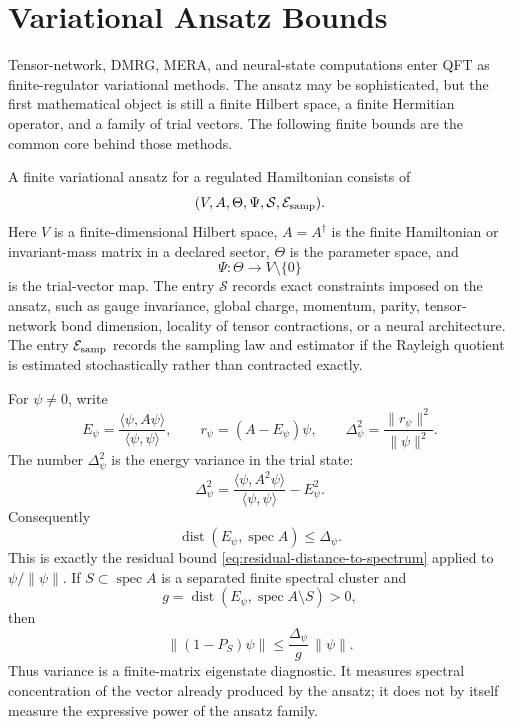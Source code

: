 \section{Variational Ansatz Bounds}
\label{sec:variational-ansatz-bounds}

Tensor-network, DMRG, MERA, and neural-state computations enter QFT as
finite-regulator variational methods.  The ansatz may be sophisticated, but
the first mathematical object is still a finite Hilbert space, a finite
Hermitian operator, and a family of trial vectors.  The following finite
bounds are the common core behind those methods.

\begin{definition}
\label{def:finite-variational-ansatz-datum}
A finite variational ansatz for a regulated Hamiltonian consists of
\[
  (V,A,\Theta,\Psi,\mathcal S,\mathcal E_{\rm samp}) .
\]
Here \(V\) is a finite-dimensional Hilbert space, \(A=A^\dagger\) is the
finite Hamiltonian or invariant-mass matrix in a declared sector,
\(\Theta\) is the parameter space, and
\[
  \Psi:\Theta\to V\setminus\{0\}
\]
is the trial-vector map.  The entry \(\mathcal S\) records exact constraints
imposed on the ansatz, such as gauge invariance, global charge, momentum,
parity, tensor-network bond dimension, locality of tensor contractions, or a
neural architecture.  The entry \(\mathcal E_{\rm samp}\) records the
sampling law and estimator if the Rayleigh quotient is estimated
stochastically rather than contracted exactly.
\end{definition}

For \(\psi\neq0\), write
\[
  E_\psi=\frac{\langle\psi,A\psi\rangle}{\langle\psi,\psi\rangle},
  \qquad
  r_\psi=(A-E_\psi)\psi,
  \qquad
  \Delta_\psi^2=\frac{\|r_\psi\|^2}{\|\psi\|^2}.
\]
The number \(\Delta_\psi^2\) is the energy variance in the trial state:
\[
  \Delta_\psi^2
  =
  \frac{\langle\psi,A^2\psi\rangle}{\langle\psi,\psi\rangle}
  -
  E_\psi^2 .
\]
Consequently
\begin{equation}
  \operatorname{dist}(E_\psi,\operatorname{spec}A)\leq \Delta_\psi .
  \label{eq:variational-variance-spectrum-distance}
\end{equation}
This is exactly the residual bound
\eqref{eq:residual-distance-to-spectrum} applied to
\(\psi/\|\psi\|\).  If \(S\subset\operatorname{spec}A\) is a separated
finite spectral cluster and
\[
  g=\operatorname{dist}(E_\psi,\operatorname{spec}A\setminus S)>0 ,
\]
then
\begin{equation}
  \|(1-P_S)\psi\|
  \leq
  \frac{\Delta_\psi}{g}\,\|\psi\| .
  \label{eq:variational-variance-projector-leakage}
\end{equation}
Thus variance is a finite-matrix eigenstate diagnostic.  It measures
spectral concentration of the vector already produced by the ansatz; it does
not by itself measure the expressive power of the ansatz family.

